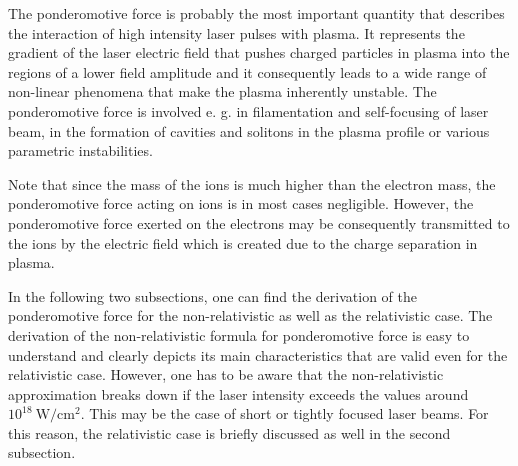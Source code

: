 The ponderomotive force is probably the most important quantity that describes the interaction of high intensity laser pulses with plasma. It represents the gradient of the laser electric field that pushes charged particles in plasma into the regions of a lower field amplitude and it consequently leads to a wide range of non-linear phenomena that make the plasma inherently unstable. The ponderomotive force is involved e. g. in filamentation and self-focusing of laser beam, in the formation of cavities and solitons in the plasma profile or various parametric instabilities.

Note that since the mass of the ions is much higher than the electron mass, the ponderomotive force acting on ions is in most cases negligible. However, the ponderomotive force exerted on the electrons may be consequently transmitted to the ions by the electric field which is created due to the charge separation in plasma.

In the following two subsections, one can find the derivation of the ponderomotive force for the non-relativistic as well as the relativistic case. The derivation of the non-relativistic formula for ponderomotive force is easy to understand and clearly depicts its main characteristics that are valid even for the relativistic case. However, one has to be aware that the non-relativistic approximation breaks down if the laser intensity exceeds the values around $ 10^{18} \ \mathrm{W/cm^2} $. This may be the case of short or tightly focused laser beams. For this reason, the relativistic case is briefly discussed as well in the second subsection.